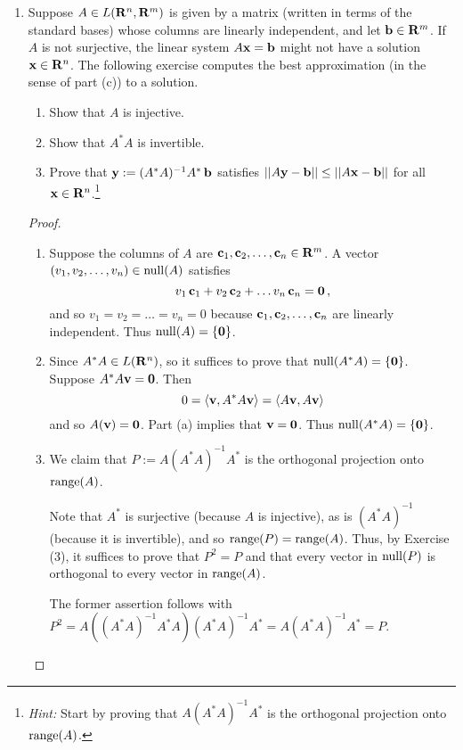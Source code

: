 \documentclass[11pt]{amsart}
\begin{document}
\begin{enumerate}[(1)]
\begin{proof}
\begin{enumerate}
\end{enumerate}
\end{proof}

\item Suppose $A \in L(\mathbf{R}^n, \mathbf{R}^m)$ is given by a matrix (written in terms of the standard bases) whose columns are linearly independent, and let $\mathbf b \in \mathbf{R}^m$.
If $A$ is not surjective, the linear system $A \mathbf x = \mathbf b$ might not have a solution $\mathbf x \in \mathbf{R}^n$.
The following exercise computes the best approximation (in the sense of part (c)) to a solution.
  \begin{enumerate}
  \item Show that $A$ is injective.
  \item Show that $A^* A$ is invertible.
  \item Prove that $\mathbf y := (A^* A)^{-1} A^* \, \mathbf b$ satisfies $\left|\left|  A \mathbf y - \mathbf b  \right|\right| \le \left|\left|  A \mathbf x - \mathbf b  \right|\right|$ for all $\mathbf x \in \mathbf{R}^n$.\footnote{
\emph{Hint:} Start by proving that $A (A^* A)^{ -1 } A^*$ is the orthogonal projection onto $\operatorname{range}(A)$.}
  \end{enumerate}

\begin{proof}
\begin{enumerate}

\item Suppose the columns of $A$ are $\mathbf c_1, \mathbf c_2, \dots, \mathbf c_n \in \mathbf{R}^m$.
A vector $\left( v_1, v_2, \dots, v_n \right) \in \operatorname{null}(A)$ satisfies
\[
  v_1 \, \mathbf c_1 + v_2 \, \mathbf c_2 + \dots v_n \, \mathbf c_n = \mathbf 0 \, ,
\]
and so $v_1 = v_2 = \dots = v_n = 0$ because $\mathbf c_1, \mathbf c_2, \dots, \mathbf c_n$ are linearly independent.
Thus $\operatorname{null}(A) = \{\mathbf 0\}$.

\item Since $A^* A \in L(\mathbf{R}^n)$, so it suffices to prove that $\operatorname{null}(A^* A) = \{\mathbf 0\}$.
Suppose $A^* A \mathbf v = \mathbf 0$. Then
\[
  0 = \left< \mathbf v,  A^* A \mathbf v  \right> = \left<  A \mathbf v ,  A \mathbf v  \right>
\]
and so $A(\mathbf v) = \mathbf 0$. Part (a) implies that $\mathbf v = \mathbf 0$.
Thus $\operatorname{null}(A^* A) = \{\mathbf 0\}$.

\item We claim that $P := A (A^* A)^{ -1 } A^*$ is the orthogonal projection onto $\operatorname{range}(A)$.

Note that $A^*$ is surjective (because $A$ is injective), as is $(A^* A)^{ -1 }$ (because it is invertible), and so $\operatorname{range}(P) = \operatorname{range}(A)$.
Thus, by Exercise (3), it suffices to prove that $P^2 = P$ and that every vector in $\operatorname{null}(P)$ is orthogonal to every vector in $\operatorname{range}(A)$.

The former assertion follows with $P^2 = A \left( (A^* A)^{ -1 } A^* A \right) (A^* A)^{ -1 } A^* = A (A^* A)^{ -1 } A^* = P$.


\end{enumerate}
\end{proof}
\end{enumerate}
\end{document}
